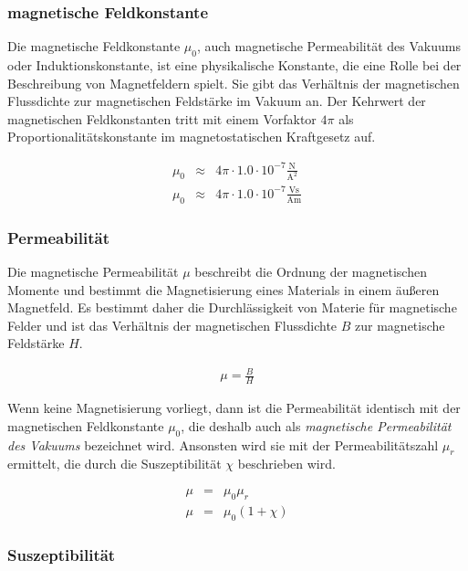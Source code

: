 \documentclass[12pt,a4paper]{scrartcl}
\numberwithin{equation}{section} %
\begin{document}
\hypertarget{magnetische-feldkonstante}{%
\subsubsection{magnetische
Feldkonstante}\label{magnetische-feldkonstante}}

Die magnetische Feldkonstante $\mu_0$, auch magnetische Permeabilität
des Vakuums oder Induktionskonstante, ist eine physikalische Konstante,
die eine Rolle bei der Beschreibung von Magnetfeldern spielt. Sie gibt
das Verhältnis der magnetischen Flussdichte zur magnetischen Feldstärke
im Vakuum an. Der Kehrwert der magnetischen Feldkonstanten tritt mit
einem Vorfaktor $4\pi$ als Proportionalitätskonstante im
magnetostatischen Kraftgesetz auf.

\begin{eqnarray}
    \mu_0 &\approx& 4\pi \cdot \mathrm{1.0 \cdot 10^{-7} \frac{N}{A^2}} \\
    \mu_0 &\approx& 4\pi \cdot \mathrm{1.0 \cdot 10^{-7} \frac{Vs}{Am}}
\end{eqnarray}

\hypertarget{permeabilituxe4t}{%
\subsubsection{Permeabilität}\label{permeabilituxe4t}}

Die magnetische Permeabilität $\mu$ beschreibt die Ordnung der
magnetischen Momente und bestimmt die Magnetisierung eines Materials in
einem äußeren Magnetfeld. Es bestimmt daher die Durchlässigkeit von
Materie für magnetische Felder und ist das Verhältnis der magnetischen
Flussdichte $B$ zur magnetische Feldstärke $H$.

\begin{eqnarray}
    \mu = \frac{B}{H}
\end{eqnarray}

Wenn keine Magnetisierung vorliegt, dann ist die Permeabilität identisch
mit der magnetischen Feldkonstante $\mu_0$, die deshalb auch als
\emph{magnetische Permeabilität des Vakuums} bezeichnet wird. Ansonsten
wird sie mit der Permeabilitätszahl $\mu_r$ ermittelt, die durch die
Suszeptibilität $\chi$ beschrieben wird.

\begin{eqnarray}
    \mu &=& \mu_0\mu_r \\
    \mu &=& \mu_0(1+\chi)
\end{eqnarray}

\hypertarget{suszeptibilituxe4t}{%
\subsubsection{Suszeptibilität}\label{suszeptibilituxe4t}}
\end{document}
